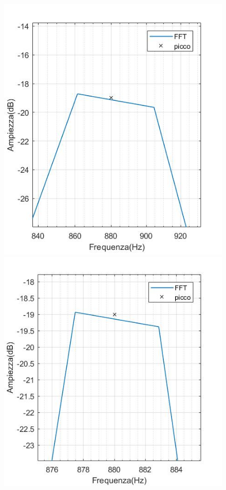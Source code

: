 \documentclass[12pt]{report}
\begin{document}
\begin{figure}[htbp]  \centering 
	\begin{minipage}[c]{.40\textwidth} 
		\centering
		\includegraphics[width= 1.14 \textwidth]{img/1024peak_phase} 
	\end{minipage}%
	\hspace{10mm}%
	\begin{minipage}[c]{.40\textwidth} 
		\centering
		\includegraphics[width= 1.2 \textwidth]{img/8192peak_phase} 

\end{minipage}
\end{figure}
\end{document}
